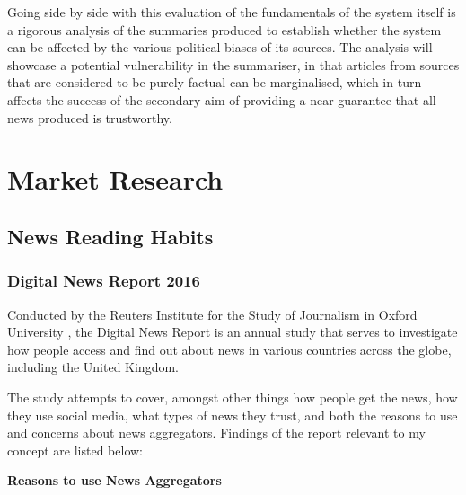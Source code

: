 \documentclass[12pt]{article}
\begin{document}
Going side by side with this evaluation of the fundamentals of the system itself is a rigorous analysis of the summaries produced to establish whether the system can be affected by the various political biases of its sources. The analysis will showcase a potential vulnerability in the summariser, in that articles from sources that are considered to be purely factual can be marginalised, which in turn affects the success of the secondary aim of providing a near guarantee that all news produced is trustworthy. 


\pagebreak

\section{Market Research}

\subsection{News Reading Habits}

\subsubsection{Digital News Report 2016}

\label{DigitalNewsReport}

Conducted by the Reuters Institute for the Study of Journalism \cite{reutersInstitute} in Oxford University \cite{oxford}, the Digital News Report \cite{digitalNewsReport} is an annual study that serves to investigate how people access and find out about news in various countries across the globe, including the United Kingdom.

The study attempts to cover, amongst other things how people get the news, how they use social media, what types of news they trust, and both the reasons to use and concerns about news aggregators. Findings of the report relevant to my concept are listed below:

\textbf{Reasons to use News Aggregators}
\end{document}
